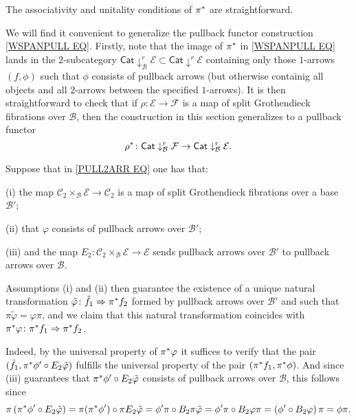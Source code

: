 \documentclass[a4paper,10pt
,draft
]{article}%
\renewcommand{\1}{\eta}%
\begin{document}
The associativity and unitality conditions of $\pi^{\**}$ are straightforward.

We will find it convenient to generalize the pullback functor
construction \eqref{WSPANPULL EQ}.
Firstly, note that the image of $\pi^{\**}$ in \eqref{WSPANPULL EQ}
lands in the $2$-subcategory
$\mathsf{Cat} \downarrow^r_{\mathcal{B}} \mathcal{E}
\subset \mathsf{Cat} \downarrow^r \mathcal{E}$ 
containing only those $1$-arrows $(f,\phi)$
such that $\phi$ consists of pullback arrows (but otherwise containig all objects and all $2$-arrows between the specified $1$-arrows).
It is then straightforward to check that if
$\rho \colon \mathcal{E} \to \mathcal{F}$ is a map of split Grothendieck fibrations over $\mathcal{B}$, then the construction in this section generalizes to a pullback functor 
\begin{equation}\label{WSPANPULL2 EQ}
\rho^{\**} \colon
\mathsf{Cat} \downarrow^r_{\mathcal{B}} \mathcal{F} 
	\to
\mathsf{Cat} \downarrow^r_{\mathcal{B}} \mathcal{E}.
\end{equation}



\begin{remark}\label{SIGMANAT REM}
Suppose that in \eqref{PULL2ARR EQ} one has that:
\begin{inparaenum}
\item[(i)] the map
$\mathcal{C}_2 \times_{\mathcal{B}} \mathcal{E}
\to \mathcal{C}_2$
is a map of split Grothendieck fibrations over a base $\mathcal{B}'$;
\item[(ii)]
that $\varphi$ consists of pullback arrows over $\mathcal{B}'$;
\item[(iii)]
and the map
$E_2 \colon \mathcal{C}_2 \times_{\mathcal{B}} \mathcal{E}
\to \mathcal{E}$
sends pullback arrows over $\mathcal{B}'$
to pullback arrows over $\mathcal{B}$.
\end{inparaenum}

Assumptions (i) and (ii) then guarantee the existence of 
a unique natural transformation
$\tilde{\varphi} \colon \tilde{f}_1
\Rightarrow \pi^{\**}f_2$
formed by pullback arrows over $\mathcal{B'}$
and such that
$\pi \tilde{\varphi} = \varphi \pi$,
and we claim that this natural transformation coincides with 
$\pi^{\**} \varphi \colon \pi^{\**}f_1 \Rightarrow \pi^{\**}f_2$.

Indeed, by the universal property of $\pi^{\**} \varphi$
it suffices to verify that the pair
$(\tilde{f}_1,\pi^{\**}\phi' \circ E_2 \tilde{\varphi})$
fulfills the universal property of the pair
$(\pi^{\**}f_1,\pi^{\**}\phi)$. 
And since (iii) guarantees that
$\pi^{\**}\phi' \circ E_2 \tilde{\varphi}$
consists of pullback arrows over $\mathcal{B}$, this follows since
\[
	\pi \left( \pi^{\**}\phi' \circ E_2 \tilde{\varphi}
	\right)
=
	\pi ( \pi^{\**}\phi') \circ \pi E_2 \tilde{\varphi}
=
	\phi' \pi \circ B_2 \pi \tilde{\varphi}
=
	\phi' \pi \circ B_2 \varphi \pi
=
	\left(\phi' \circ B_2 \varphi \right) \pi
=
	\phi \pi.
\]
\end{remark}
\end{document}
